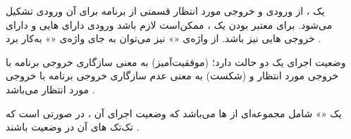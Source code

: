 
یک ، از ورودی و خروجی مورد انتظار قسمتی از برنامه برای
آن ورودی تشکیل می‌شود. برای معتبر بودن یک ، ممکن‌است لازم
باشد ورودی دارای ‌هایی و دارای خروجی
‌هایی نیز باشد. از واژه‌ی «» نیز می‌توان به
جای واژه‌ی «» به‌کار برد .

وضعیت اجرای یک  دو حالت دارد؛  (موفقیت‌آمیز) به
معنی سازگاری خروجی برنامه با خروجی مورد انتظار و  (شکست) به
معنی عدم سازگاری خروجی برنامه با خروجی مورد انتظار می‌باشد
.

یک «» شامل مجموعه‌ای از ‌ها می‌باشد که وضعیت
اجرای آن ، در صورتی  است که تک‌تک
‌های آن در وضعیت  باشند .


